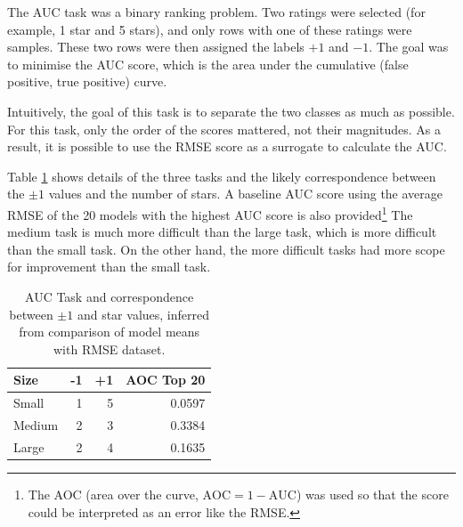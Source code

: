 \documentclass{article}
\begin{document}
The AUC task was a binary ranking problem.  Two ratings were selected (for example, 1 star and 5 stars), and only rows with one of these ratings were samples.  These two rows were then assigned the labels $+1$ and $-1$.  The goal was to minimise the AUC score, which is the area under the cumulative (false positive, true positive) curve.

Intuitively, the goal of this task is to separate the two classes as much as possible.  For this task, only the order of the scores mattered, not their magnitudes.  As a result, it is possible to use the RMSE score as a surrogate to calculate the AUC.

Table \ref{auc} shows details of the three tasks and the likely correspondence between the $\pm 1$ values and the number of stars.  A baseline AUC score using the average RMSE of the 20 models with the highest AUC score is also provided\footnote{The AOC (area over the curve, $\mathrm{AOC} = 1 - \mathrm{AUC}$) was used so that the score could be interpreted as an error like the RMSE.}
The medium task is much more difficult than the large task, which is more difficult than the small task.  On the other hand, the more difficult tasks had more scope for improvement than the small task.


\begin{table}[t]
\caption{AUC Task and correspondence between $\pm 1$ and star values, inferred from comparison of model means with RMSE dataset.}
\label{auc}
\vskip 0.15in
\begin{center}
\begin{small}
\begin{sc}
\begin{tabular}{lrrr}
\hline
\abovespace\belowspace
Size & -1 & +1 & AOC Top 20 \\
\hline
\abovespace
Small    & 1 & 5 & 0.0597 \\
Medium   & 2 & 3 & 0.3384 \\
\belowspace
Large    & 2 & 4 & 0.1635 \\
\hline
\end{tabular}
\end{sc}
\end{small}
\end{center}
\vskip -0.1in
\end{table}
\end{document}
